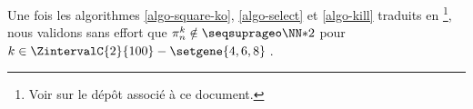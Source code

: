 \leavevmode
\smallskip

Une fois les algorithmes \ref{algo-square-ko}, \ref{algo-select} et \ref{algo-kill} traduits en \python
\footnote{
	Voir sur le dépôt associé à ce document.
},
nous validons sans effort que $\consprod \notin \NNssquare$ pour $k \in \ZintervalC{2}{100} - \setgene{4, 6, 8}$\,.
